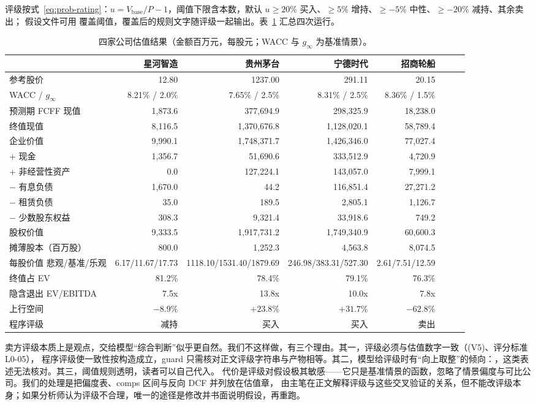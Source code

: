 评级按式~\eqref{eq:prob-rating}：$u=V_{\text{base}}/P-1$，阈值下限含本数，默认 $u\ge20\%$ 买入、$\ge5\%$ 增持、$\ge-5\%$ 中性、$\ge-20\%$ 减持、其余卖出；
假设文件可用  覆盖阈值，覆盖后的规则文字随评级一起输出。表~\ref{tab:val-real} 汇总四次运行。

\begin{table}[t]
\centering
\caption{四家公司估值结果（金额百万元，每股元；WACC 与 $g_\infty$ 为基准情景）。}
\label{tab:val-real}
\footnotesize
\begin{tabular}{@{}lrrrrrrr@{}}
\toprule
 & 星河智造 & 贵州茅台 & 宁德时代 & 招商轮船 \\
\midrule
参考股价 & 12.80 & 1237.00 & 291.11 & 20.15 \\
WACC / $g_\infty$ & 8.21\% / 2.0\% & 7.65\% / 2.5\% & 8.31\% / 2.5\% & 8.36\% / 1.5\% \\
预测期 FCFF 现值 & 1,873.6 & 377,694.9 & 298,325.9 & 18,238.0 \\
终值现值 & 8,116.5 & 1,370,676.8 & 1,128,020.1 & 58,789.4 \\
企业价值 & 9,990.1 & 1,748,371.7 & 1,426,346.0 & 77,027.4 \\
\quad + 现金 & 1,356.7 & 51,690.6 & 333,512.9 & 4,720.9 \\
\quad + 非经营性资产 & 0.0 & 127,224.1 & 143,057.0 & 7,999.1 \\
\quad − 有息负债 & 1,670.0 & 44.2 & 116,851.4 & 27,271.2 \\
\quad − 租赁负债 & 35.0 & 189.5 & 2,805.1 & 1,126.7 \\
\quad − 少数股东权益 & 308.3 & 9,321.4 & 33,918.6 & 749.2 \\
股权价值 & 9,333.5 & 1,917,731.2 & 1,749,340.9 & 60,600.3 \\
摊薄股本（百万股） & 800.0 & 1,252.3 & 4,563.8 & 8,074.5 \\
每股价值 悲观/基准/乐观 & 6.17/11.67/17.73 & 1118.10/1531.40/1879.69 & 246.98/383.31/527.30 & 2.61/7.51/12.59 \\
终值占 EV & 81.2\% & 78.4\% & 79.1\% & 76.3\% \\
隐含退出 EV/EBITDA & 7.5x & 13.8x & 10.0x & 7.8x \\
上行空间 & $-8.9\%$ & $+23.8\%$ & $+31.7\%$ & $-62.8\%$ \\
程序评级 & 减持 & 买入 & 买入 & 卖出 \\
\bottomrule
\end{tabular}
\end{table}

\begin{tradeoff}[：评级由程序给]
卖方评级本质上是观点，交给模型“综合判断”似乎更自然。我们不这样做，有三个理由。其一，评级必须与估值数字一致（(V5)、评分标准 L0-05），
程序评级使一致性按构造成立，guard 只需核对正文评级字符串与产物相等。其二，模型给评级时有“向上取整”的倾向：，这类表述无法核对。其三，阈值规则透明，读者可以自己代入。
代价是评级对假设极其敏感——它只是基准情景的函数，忽略了情景偏度与可比公司。我们的处理是把偏度表、comps 区间与反向 DCF 并列放在估值章，
由主笔在正文解释评级与这些交叉验证的关系，但不能改评级本身；如果分析师认为评级不合理，唯一的途径是修改并书面说明假设，再重跑。
\end{tradeoff}

